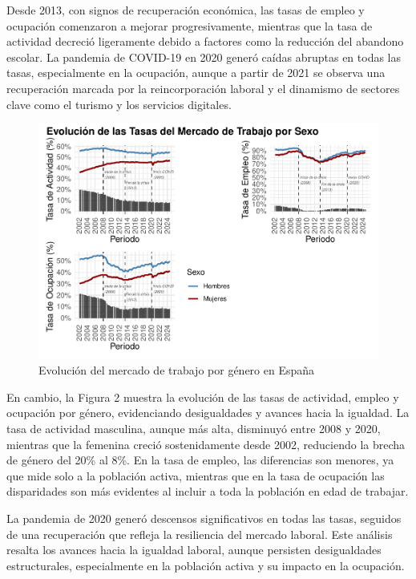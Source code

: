 \documentclass[Universitat de
València,article,submit,moreauthors,pdftex]{Definitions/mdpi}
\begin{document}
Desde 2013, con signos de recuperación económica, las tasas de empleo y
ocupación comenzaron a mejorar progresivamente, mientras que la tasa de
actividad decreció ligeramente debido a factores como la reducción del
abandono escolar. La pandemia de COVID-19 en 2020 generó caídas abruptas
en todas las tasas, especialmente en la ocupación, aunque a partir de
2021 se observa una recuperación marcada por la reincorporación laboral
y el dinamismo de sectores clave como el turismo y los servicios
digitales.

\begin{figure}[h]

{\centering \includegraphics[width=1\linewidth]{ProyectoAED2024_files/figure-latex/unnamed-chunk-28-1} 

}

\caption{Evolución del mercado de trabajo por género en España}\label{fig:unnamed-chunk-28}
\end{figure}

En cambio, la Figura 2 muestra la evolución de las tasas de actividad,
empleo y ocupación por género, evidenciando desigualdades y avances
hacia la igualdad. La tasa de actividad masculina, aunque más alta,
disminuyó entre 2008 y 2020, mientras que la femenina creció
sostenidamente desde 2002, reduciendo la brecha de género del 20\% al
8\%. En la tasa de empleo, las diferencias son menores, ya que mide solo
a la población activa, mientras que en la tasa de ocupación las
disparidades son más evidentes al incluir a toda la población en edad de
trabajar.

La pandemia de 2020 generó descensos significativos en todas las tasas,
seguidos de una recuperación que refleja la resiliencia del mercado
laboral. Este análisis resalta los avances hacia la igualdad laboral,
aunque persisten desigualdades estructurales, especialmente en la
población activa y su impacto en la ocupación.\newline
\end{document}

